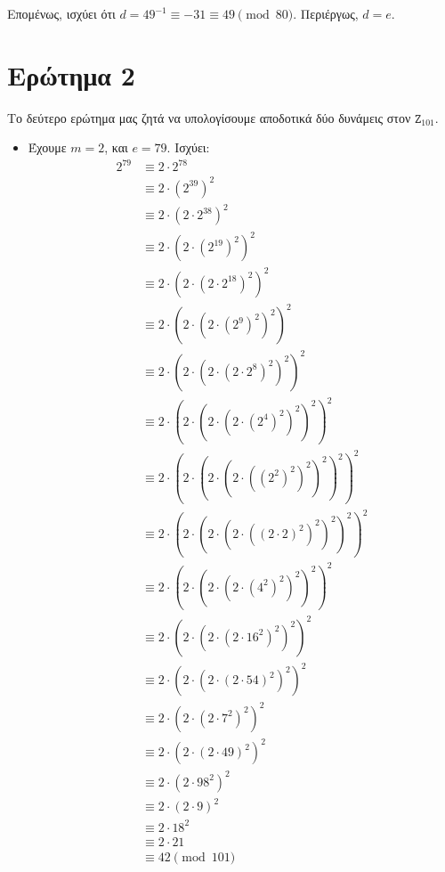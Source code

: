 \documentclass{article}
\begin{document}
Επομένως, ισχύει ότι $d = 49^{-1} \equiv -31 \equiv 49 \pmod {80}$. Περιέργως, $d = e$.

\section*{Ερώτημα 2}

Το δεύτερο ερώτημα μας ζητά να υπολογίσουμε αποδοτικά δύο δυνάμεις στον $\mathtt{Z}_{101}$.

\begin{itemize}
    \item {Έχουμε $m = 2$, και $e = 79$. Ισχύει:
        \begin{align*}
        2^{79}
        & \equiv 2 \cdot 2^{78} \\
        & \equiv 2 \cdot (2^{39})^2 \\
        & \equiv 2 \cdot (2 \cdot 2^{38})^2 \\
        & \equiv 2 \cdot (2 \cdot (2^{19})^2)^2 \\
        & \equiv 2 \cdot (2 \cdot (2 \cdot 2^{18})^2)^2 \\
        & \equiv 2 \cdot (2 \cdot (2 \cdot (2^9)^2)^2)^2 \\
        & \equiv 2 \cdot (2 \cdot (2 \cdot (2 \cdot 2^8)^2)^2)^2 \\
        & \equiv 2 \cdot (2 \cdot (2 \cdot (2 \cdot (2^4)^2)^2)^2)^2 \\
        & \equiv 2 \cdot (2 \cdot (2 \cdot (2 \cdot ((2^2)^2)^2)^2)^2)^2 \\
        & \equiv 2 \cdot (2 \cdot (2 \cdot (2 \cdot ((2 \cdot 2)^2)^2)^2)^2)^2 \\
        & \equiv 2 \cdot (2 \cdot (2 \cdot (2 \cdot (4^2)^2)^2)^2)^2 \\
        & \equiv 2 \cdot (2 \cdot (2 \cdot (2 \cdot 16^2)^2)^2)^2 \\
        & \equiv 2 \cdot (2 \cdot (2 \cdot (2 \cdot 54)^2)^2)^2 \\
        & \equiv 2 \cdot (2 \cdot (2 \cdot 7^2)^2)^2 \\
        & \equiv 2 \cdot (2 \cdot (2 \cdot 49)^2)^2 \\
        & \equiv 2 \cdot (2 \cdot 98^2)^2 \\
        & \equiv 2 \cdot (2 \cdot 9)^2 \\
        & \equiv 2 \cdot 18^2 \\
        & \equiv 2 \cdot 21 \\
        & \equiv 42 \pmod{101}
        \end{align*}}
    

\end{itemize}
\end{document}
